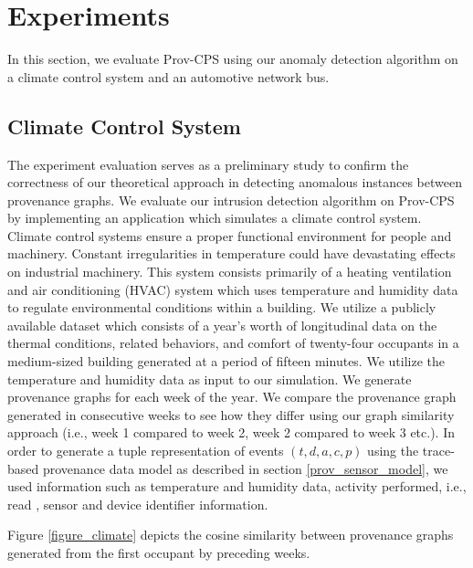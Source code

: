 
\chapter{Experiments}

In this section, we evaluate Prov-CPS using our anomaly detection algorithm on a climate control system and an automotive network bus.

\section{Climate Control System}
The experiment evaluation serves as a preliminary study to confirm the correctness of our theoretical approach in detecting anomalous instances between provenance graphs. We evaluate our intrusion detection algorithm on Prov-CPS by implementing an application which simulates a climate control system. Climate control systems ensure a proper functional environment for people and machinery. Constant irregularities in temperature could have devastating effects on industrial machinery. This system consists primarily of a heating ventilation and air conditioning (HVAC) system which uses temperature and humidity data to regulate environmental conditions within a building. We utilize a publicly available dataset \cite{LANGEVIN201594} which consists of a year's worth of longitudinal data on the thermal conditions, related behaviors, and comfort of twenty-four occupants in a medium-sized building generated at  a period of fifteen minutes. We utilize the temperature and humidity data as input to our simulation. We generate provenance graphs for each week of the year. We compare the provenance graph generated in consecutive weeks to see how they differ using our graph similarity approach (i.e., week 1 compared to week 2, week 2 compared to week 3 etc.). In order to generate a tuple representation of events $(t, d, a, c, p)$ using the trace-based provenance data model as described in section \ref{prov_sensor_model}, we used information such as temperature and humidity data, activity performed, i.e., read , sensor and device identifier information.
\par Figure \ref{figure_climate} depicts the cosine similarity between provenance graphs generated from the first occupant by preceding weeks. 


